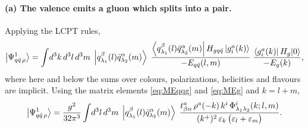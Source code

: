 \paragraph{(a) The valence emits a gluon which splits into a pair.}
\begin{center}
\end{center}
Applying the LCPT rules,
\begin{equation}
\left|\Psi^{1}_{q\bar q\,\rho}\right\rangle=\int\! d^{3}k\,d^{3}l\,d^{3}m\;
\left|q^{\beta}_{\lambda_{1}}(l)\bar q^{\alpha}_{\lambda_{2}}(m)\right\rangle\;
\frac{\left\langle q^{\beta}_{\lambda_{1}}(l)\bar q^{\alpha}_{\lambda_{2}}(m)\right|H_{gq\bar q}\left|g^{a}_{i}(k)\right\rangle}
{-E_{q\bar q}(l,m)}\;
\frac{\left\langle g^{a}_{i}(k)\right|H_{g}|0\rangle}{-E_{g}(k)} ,
\label{eq:Pvac1def}
\end{equation}
where here and below the sums over colours, polarizations, helicities and flavours are implicit.
Using the matrix elements \eqref{eq:MEqqg} and \eqref{eq:MEg} and $k=l+m$,
\begin{equation}
\left|\Psi^{1}_{q\bar q\,\rho}\right\rangle=\frac{g^{2}}{32\pi^{3}}\int\!d^{3}l\,d^{3}m\;
\left|q^{\beta}_{\lambda_{1}}(l)\bar q^{\alpha}_{\lambda_{2}}(m)\right\rangle\;
\frac{t^{a}_{\beta\alpha}\,\rho^{a}(-k)\,k^{i}\,\Phi^{i}_{\lambda_{1}\lambda_{2}}(k;l,m)}
{(k^{+})^{2}\,\varepsilon_{k}\,\big(\varepsilon_{l}+\varepsilon_{m}\big)} .
\label{eq:Pvac1}
\end{equation}

